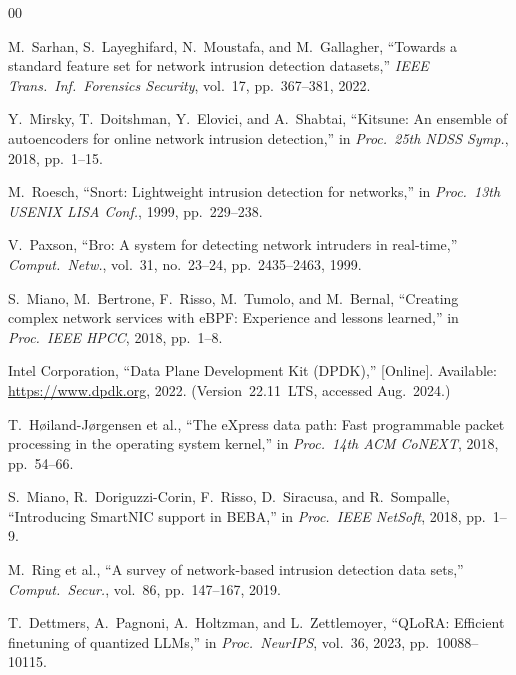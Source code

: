 \documentclass{ieeeaccess}
\renewcommand{\_}{\textunderscore\allowbreak}
\begin{document}
\begin{thebibliography}{00}

M.~Sarhan, S.~Layeghifard, N.~Moustafa, and M.~Gallagher, ``Towards a standard
feature set for network intrusion detection datasets,''
\emph{IEEE Trans.\ Inf.\ Forensics Security}, vol.~17, pp.~367--381, 2022.

Y.~Mirsky, T.~Doitshman, Y.~Elovici, and A.~Shabtai, ``Kitsune: An ensemble of
autoencoders for online network intrusion detection,''
in \emph{Proc.\ 25th NDSS Symp.}, 2018, pp.~1--15.

M.~Roesch, ``Snort: Lightweight intrusion detection for networks,''
in \emph{Proc.\ 13th USENIX LISA Conf.}, 1999, pp.~229--238.

V.~Paxson, ``Bro: A system for detecting network intruders in real-time,''
\emph{Comput.\ Netw.}, vol.~31, no.~23--24, pp.~2435--2463, 1999.

S.~Miano, M.~Bertrone, F.~Risso, M.~Tumolo, and M.~Bernal, ``Creating complex
network services with eBPF: Experience and lessons learned,''
in \emph{Proc.\ IEEE HPCC}, 2018, pp.~1--8.

Intel Corporation, ``Data Plane Development Kit (DPDK),''
[Online]. Available: \url{https://www.dpdk.org}, 2022.
(Version~22.11~LTS, accessed Aug.~2024.)

T.~H{\o}iland-J{\o}rgensen et al., ``The eXpress data path: Fast programmable
packet processing in the operating system kernel,''
in \emph{Proc.\ 14th ACM CoNEXT}, 2018, pp.~54--66.

S.~Miano, R.~Doriguzzi-Corin, F.~Risso, D.~Siracusa, and R.~Sompalle,
``Introducing SmartNIC support in BEBA,''
in \emph{Proc.\ IEEE NetSoft}, 2018, pp.~1--9.

M.~Ring et al., ``A survey of network-based intrusion detection data sets,''
\emph{Comput.\ Secur.}, vol.~86, pp.~147--167, 2019.

T.~Dettmers, A.~Pagnoni, A.~Holtzman, and L.~Zettlemoyer, ``QLoRA: Efficient
finetuning of quantized LLMs,''
in \emph{Proc.\ NeurIPS}, vol.~36, 2023, pp.~10088--10115.


\end{thebibliography}
\end{document}
